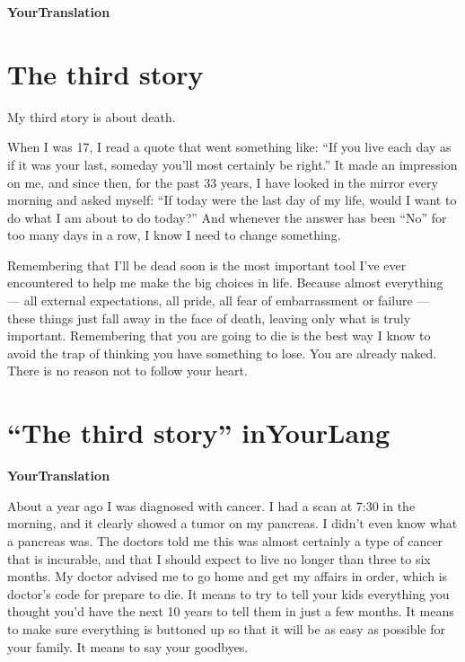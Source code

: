 \documentclass[a4,twocolumn]{article}
\begin{document}
\newpage

{\bf YourTranslation}

\newpage

\section*{The third story}

My third story is about death.

When I was 17, I read a quote that went something like: ``If you live each day as if it was your last, someday you'll most certainly be right.'' It made an impression on me, and since then, for the past 33 years, I have looked in the mirror every morning and asked myself: ``If today were the last day of my life, would I want to do what I am about to do today?'' And whenever the answer has been ``No'' for too many days in a row, I know I need to change something.

Remembering that I'll be dead soon is the most important tool I've ever encountered to help me make the big choices in life. Because almost everything — all external expectations, all pride, all fear of embarrassment or failure — these things just fall away in the face of death, leaving only what is truly important. Remembering that you are going to die is the best way I know to avoid the trap of thinking you have something to lose. You are already naked. There is no reason not to follow your heart.



\newpage

\section*{``The third story'' inYourLang}

{\bf YourTranslation}

\newpage

About a year ago I was diagnosed with cancer. I had a scan at 7:30 in the morning, and it clearly showed a tumor on my pancreas. I didn't even know what a pancreas was. The doctors told me this was almost certainly a type of cancer that is incurable, and that I should expect to live no longer than three to six months. My doctor advised me to go home and get my affairs in order, which is doctor's code for prepare to die. It means to try to tell your kids everything you thought you'd have the next 10 years to tell them in just a few months. It means to make sure everything is buttoned up so that it will be as easy as possible for your family. It means to say your goodbyes.
\end{document}
